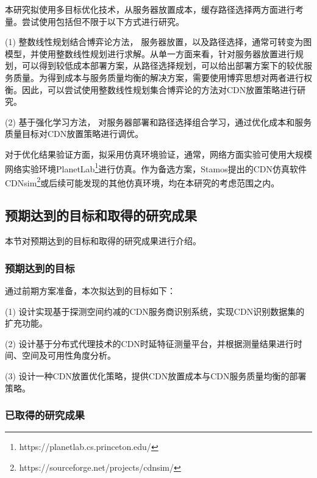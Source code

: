 本研究拟使用多目标优化技术，从服务器放置成本，缓存路径选择两方面进行考量。尝试使用包括但不限于以下方式进行研究。

(1) 整数线性规划结合博弈论方法， 服务器放置，以及路径选择，通常可转变为图模型，并使用整数线性规划进行求解。从单一方面来看，针对服务器放置进行规划，可以得到较低成本部署方案，从路径选择规划，可以给出部署方案下的较优服务质量。为得到成本与服务质量均衡的解决方案，需要使用博弈思想对两者进行权衡。因此，可以尝试使用整数线性规划集合博弈论的方法对CDN放置策略进行研究。

(2) 基于强化学习方法， 对服务器部署和路径选择组合学习，通过优化成本和服务质量目标对CDN放置策略进行调优。


对于优化结果验证方面，拟采用仿真环境验证，通常，网络方面实验可使用大规模网络实验环境PlanetLab\footnote{https://planetlab.cs.princeton.edu/}进行仿真。作为备选方案，Stamos\cite{stamos2010cdnsim}提出的CDN仿真软件CDNsim\footnote{https://sourceforge.net/projects/cdnsim/}或后续可能发现的其他仿真环境，均在本研究的考虑范围之内。

\subsection{预期达到的目标和取得的研究成果}
本节对预期达到的目标和取得的研究成果进行介绍。
\subsubsection{预期达到的目标}

通过前期方案准备，本次拟达到的目标如下：

(1) 设计实现基于探测空间约减的CDN服务商识别系统，实现CDN识别数据集的扩充功能。

(2) 设计基于分布式代理技术的CDN时延特征测量平台，并根据测量结果进行时间、空间及可用性角度分析。

(3) 设计一种CDN放置优化策略，提供CDN放置成本与CDN服务质量均衡的部署策略。

\subsubsection{已取得的研究成果}

